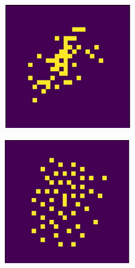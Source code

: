 \documentclass[a4paper,twocolumn]{article} %
\begin{document}
\begin{figure}[h!]
\begin{subfigure}[t]{0.19\linewidth}
    \end{subfigure}
    \hfill
    \begin{subfigure}[t]{0.19\linewidth}
        \includegraphics[width=\linewidth]{figures/reference_features_gl.png}
    \end{subfigure}
    \hfill
    \begin{subfigure}[t]{0.19\linewidth}
        \includegraphics[width=\linewidth]{figures/reference_features_seql.png}

\end{subfigure}
\end{figure}
\end{document}
